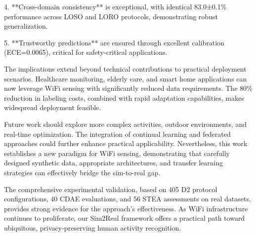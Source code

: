 \documentclass[journal]{IEEEtran}
\begin{document}
4. **Cross-domain consistency** is exceptional, with identical 83.0±0.1\% performance across LOSO and LORO protocols, demonstrating robust generalization.

5. **Trustworthy predictions** are ensured through excellent calibration (ECE=0.0065), critical for safety-critical applications.

The implications extend beyond technical contributions to practical deployment scenarios. Healthcare monitoring, elderly care, and smart home applications can now leverage WiFi sensing with significantly reduced data requirements. The 80\% reduction in labeling costs, combined with rapid adaptation capabilities, makes widespread deployment feasible.

Future work should explore more complex activities, outdoor environments, and real-time optimization. The integration of continual learning and federated approaches could further enhance practical applicability. Nevertheless, this work establishes a new paradigm for WiFi sensing, demonstrating that carefully designed synthetic data, appropriate architectures, and transfer learning strategies can effectively bridge the sim-to-real gap.

The comprehensive experimental validation, based on 405 D2 protocol configurations, 40 CDAE evaluations, and 56 STEA assessments on real datasets, provides strong evidence for the approach's effectiveness. As WiFi infrastructure continues to proliferate, our Sim2Real framework offers a practical path toward ubiquitous, privacy-preserving human activity recognition.



\end{document}
